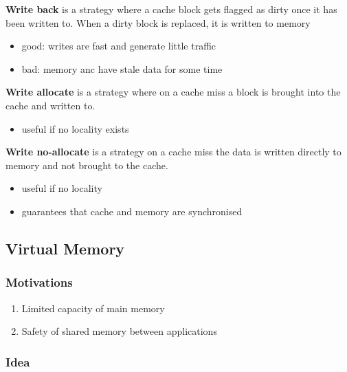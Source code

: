 \documentclass{article}
\begin{document}
\begin{definition}
	\textbf{Write back} is a strategy where a cache block gets flagged as
	dirty once it has been written to. When a dirty block is replaced,
	it is written to memory
	\begin{itemize}
		\item good: writes are fast and generate little traffic
		\item bad: memory anc have stale data for some time
	\end{itemize}
\end{definition}

\begin{definition}
	\textbf{Write allocate} is a strategy where on a cache miss a block
	is brought into the cache and written to.
	\begin{itemize}
		\item useful if no locality exists
	\end{itemize}
\end{definition}

\begin{definition}
	\textbf{Write no-allocate} is a strategy on a cache miss the data is
	written directly to memory and not brought to the cache.
	\begin{itemize}
		\item useful if no locality
		\item guarantees that cache and memory are synchronised
	\end{itemize}
\end{definition}


\subsection{Virtual Memory}


\subsubsection{Motivations}

\begin{enumerate}
	\item Limited capacity of main memory
	\item Safety of shared memory between applications
\end{enumerate}

\subsubsection{Idea}
\end{document}
